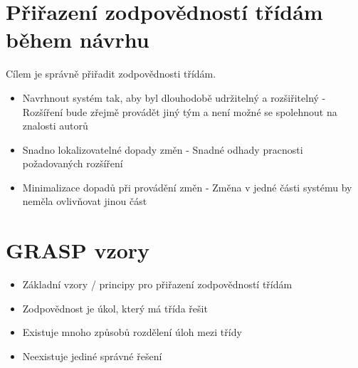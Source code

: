 \documentclass{szzclass}
\begin{document}
\tableofcontents
\newpage

\section{Přiřazení zodpovědností třídám během návrhu}
Cílem je správně přiřadit zodpovědnosti třídám.
\begin{itemize}
\item Navrhnout systém tak, aby byl dlouhodobě udržitelný a rozšiřitelný - Rozšíření bude zřejmě provádět jiný tým a není možné se spolehnout na znalosti autorů
\item Snadno lokalizovatelné dopady změn - Snadné odhady pracnosti požadovaných rozšíření
\item Minimalizace dopadů při provádění změn - Změna v jedné části systému by neměla ovlivňovat jinou část
\end{itemize}

\section{GRASP vzory}
\begin{itemize}
\item Základní vzory / principy pro přiřazení zodpovědností třídám
\item Zodpovědnost je úkol, který má třída řešit
\item Existuje mnoho způsobů rozdělení úloh mezi třídy
\item Neexistuje jediné správné řešení
\end{itemize}
\end{document}
